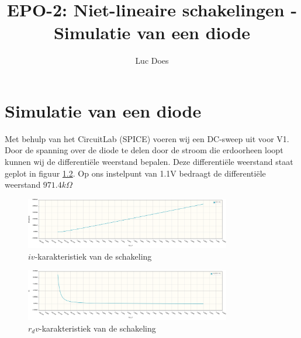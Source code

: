 \documentclass{report}
\title{EPO-2: Niet-lineaire schakelingen - Simulatie van een diode}
\author{Luc Does}
\begin{document}
\chapter{Simulatie van een diode}
\label{ch: Simulatie van een diode}

Met behulp van het CircuitLab (SPICE) voeren wij een DC-sweep uit voor V1. Door de spanning over de diode te delen door de stroom die erdoorheen loopt kunnen wij de differentiële weerstand bepalen. Deze differentiële weerstand staat geplot in figuur \ref{fig:rdv}. Op ons instelpunt van 1.1V bedraagt de differentiële weerstand $971.4k\Omega$
\begin{figure}[H] 
	\centering
	\includegraphics[width=0.8\textwidth]{iv.png}
	\caption{$iv$-karakteristiek van de schakeling}
	\label{fig:iv}
\end{figure}

\begin{figure}[H]
	\centering
	\includegraphics[width=0.8\textwidth]{RdV.png}
	\caption{$r_dv$-karakteristiek van de schakeling}
	\label{fig:rdv}
\end{figure}
\end{document}
